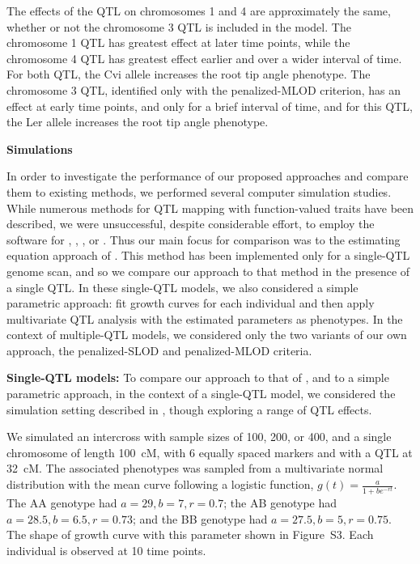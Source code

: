\documentclass[12pt,letterpaper]{article}
\begin{document}
The effects of the QTL on chromosomes 1 and 4 are approximately the
same, whether or not the chromosome 3 QTL is included in the model.
The chromosome 1 QTL has greatest effect at later time points, while
the chromosome 4 QTL has greatest effect earlier and over a wider
interval of time.  For both QTL, the Cvi allele increases the root tip
angle phenotype.
The chromosome 3 QTL, identified only with the penalized-MLOD
criterion, has an effect at early time points, and only for a brief
interval of time, and for this QTL, the Ler allele increases the root tip
angle phenotype.

\clearpage

\centerline{\sffamily \textbf{Simulations}}

In order to investigate the performance of our proposed approaches and
compare them to existing methods, we performed several computer
simulation studies. While numerous methods for QTL mapping with
function-valued traits have been described, we were unsuccessful,
despite considerable effort, to employ the software for
\citet{Yang2009}, \citet{Yap2009}, \citet{Min2011}, or
\citet{Sillanpaa2012}. Thus our main focus for comparison was to the
estimating equation approach of \citet{Xiong2011}. This method has
been implemented only for a single-QTL genome scan, and so we compare
our approach to that method in the presence of a single QTL.
In these
single-QTL models, we also considered a simple parametric approach:
fit growth curves for each individual \citep{Kahm2010} and then apply
multivariate QTL analysis \citep{Knott2000} with the estimated
parameters as phenotypes. In the context of multiple-QTL models, we
considered only the two variants of our own approach, the
penalized-SLOD and penalized-MLOD criteria.


\textbf{Single-QTL models:}
To compare our approach to that of \citet{Xiong2011}, and to a simple
parametric approach, in the context of
a single-QTL model, we considered the simulation setting described in
\citet{Yap2009}, though exploring a range of QTL effects.

We simulated an intercross with sample sizes of 100, 200, or 400, and a
single chromosome of length 100~cM,
with 6 equally spaced markers and with a QTL at 32~cM. The associated
phenotypes was sampled from a multivariate normal distribution with
the mean curve following a logistic function, $g(t) = \frac{a}{1+b e^{-rt}}$.
The AA genotype had $a=29, b=7, r=0.7$; the AB genotype had $a=28.5,
b=6.5, r=0.73$; and the BB genotype had $a=27.5,
b=5, r=0.75$. The shape of growth curve with this parameter shown in
Figure~S3. Each individual is observed at 10 time
points.
\end{document}

